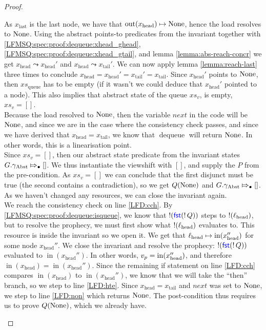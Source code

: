 \documentclass[a4paper, 10pt]{report}
\theoremstyle{definition}
\newcommand{\dequeue}{\operatorname{dequeue}}
\newcommand{\xsqueue}{xs_{\mathrm{queue}}}
\newcommand{\locN}[1]{\loc_{\mathrm{#1}}}
\newcommand{\lochead}{\locN{head}}
\newcommand{\nIn}[1]{\operatorname{in}(#1)}
\newcommand{\nOut}[1]{\operatorname{out}(#1)}
\newcommand{\node}{x}
\newcommand{\nodeN}[1]{\node_{\mathrm{#1}}}
\newcommand{\nodehead}{\nodeN{head}}
\newcommand{\nodetail}{\nodeN{tail}}
\newcommand{\nodelast}{\nodeN{last}}
\newcommand{\absvalueList}{xs_v}
\newcommand{\prophval}{\val_p}
\newcommand{\Qg}{G}
\newcommand{\gabst}{\gname_{\mathrm{Abst}}}
\newcommand{\abstractstateauth}[2]{#1 \Mapsto_{\bullet} #2}
\newcommand{\reach}[2]{#1 \leadsto #2}
\begin{document}
\begin{proof}
\begin{itemize}
\begin{itemize}
      As $\nodelast$ is the last node, we have that $\nOut{\nodehead} \mapsto \None$, hence the load resolves to $\operatorname{None}$. Using the abstract points-to predicates from the invariant together with \ref{LFMSQ:spec:proof:dequeue:xhead_ghead}, \ref{LFMSQ:spec:proof:dequeue:xhead_gtail}, and lemma \ref{lemma:abs-reach-concr} we get $\reach{\nodehead}{\nodehead'}$ and $\reach{\nodehead}{\nodetail'}$. We can now apply lemma \ref{lemma:reach-last} three times to conclude $\nodehead = \nodehead' = \nodetail' = \nodetail$. Since $\nodehead'$ points to $\operatorname{None}$, then $\xsqueue$ has to be empty (if it wasn't we could deduce that $\nodehead'$ pointed to a node). This also implies that abstract state of the queue $\absvalueList$, is empty, $\absvalueList = []$.\\
      Because the load resolved to $\operatorname{None}$, then the variable $next$ in the code will be $\operatorname{None}$, and since we are in the case where the consistency check passes, and since we have derived that $\nodehead = \nodetail$, we know that $\dequeue$ will return $\operatorname{None}$. In other words, this is a linearisation point.\\
      Since $\absvalueList = []$, then our abstract state predicate from the invariant states $\abstractstateauth{\Qg.\gabst}{[]}$. We thus instantiate the viewshift with $[]$, and supply the $P$ from the pre-condition. As $\absvalueList = []$ we can conclude that the first disjunct must be true (the second contains a contradiction), so we get $Q(\operatorname{None})$ and $\abstractstateauth{\Qg.\gabst}{[]}$. As we haven't changed any resources, we can close the invariant again.\\
      We reach the consistency check on line \ref{LFD:cch}. By \ref{LFMSQ:spec:proof:dequeue:isqueue}, we know that $\mathop{!}(\operatorname{\textsf{\color{blue} fst}} (\mathop{!} Q))$ steps to $\deref(\lochead)$, but to resolve the prophecy, we must first show what $\deref(\lochead)$ evaluates to. This resource is inside the invariant so we open it. We get that $\lochead \mapsto \nIn{\nodehead''}$ for some node $\nodehead''$. We close the invariant and resolve the prophecy: $\mathop{!}(\operatorname{\textsf{\color{blue} fst}} (\mathop{!} Q))$ evaluated to $\nIn{\nodehead''}$. In other words, $\prophval = \nIn{\nodehead''}$, and therefore $\nIn{\nodehead} = \nIn{\nodehead''}$. Since the remaining if statement on line \ref{LFD:cch} compares $\nIn{\nodehead}$ to $\nIn{\nodehead''}$, we know that we will take the ``then'' branch, so we step to line \ref{LFD:hte}. Since $\nodehead = \nodetail$ and $next$ was set to $\operatorname{None}$, we step to line \ref{LFD:non} which returns $\operatorname{None}$. The post-condition thus requires us to prove $Q(\operatorname{None})$, which we already have.


\end{itemize}
\end{itemize}
\end{proof}
\end{document}
